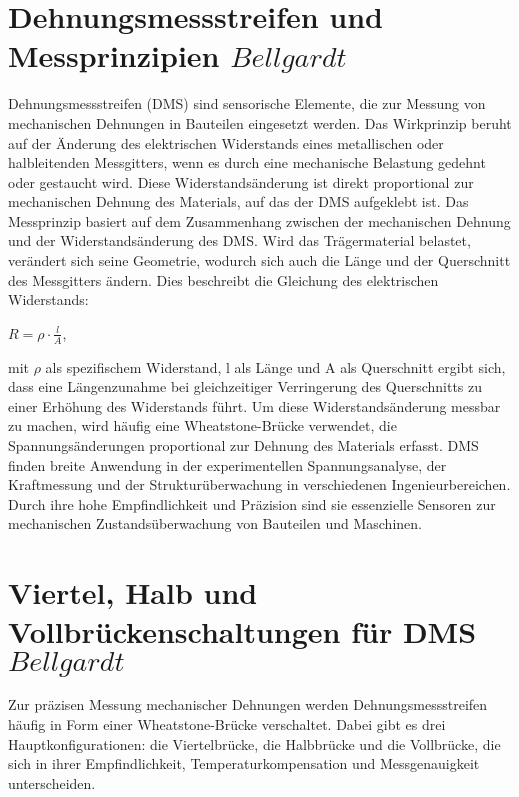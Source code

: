 \section{Dehnungsmessstreifen und Messprinzipien \(Bellgardt\)}
Dehnungsmessstreifen (DMS) sind sensorische Elemente, die zur Messung von mechanischen Dehnungen in Bauteilen eingesetzt werden. Das Wirkprinzip beruht auf der Änderung des elektrischen Widerstands eines metallischen oder halbleitenden Messgitters, wenn es durch eine mechanische Belastung gedehnt oder gestaucht wird. Diese Widerstandsänderung ist direkt proportional zur mechanischen Dehnung des Materials, auf das der DMS aufgeklebt ist. 
Das Messprinzip basiert auf dem Zusammenhang zwischen der mechanischen Dehnung und der Widerstandsänderung des DMS. Wird das Trägermaterial belastet, verändert sich seine Geometrie, wodurch sich auch die Länge und der Querschnitt des Messgitters ändern. Dies beschreibt die Gleichung des elektrischen Widerstands:

$R = \rho \cdot \frac{l}{A}$,

mit $\rho$ als spezifischem Widerstand, l als Länge und A als Querschnitt ergibt sich, dass eine Längenzunahme bei gleichzeitiger Verringerung des Querschnitts zu einer Erhöhung des Widerstands führt. Um diese Widerstandsänderung messbar zu machen, wird häufig eine Wheatstone-Brücke verwendet, die Spannungsänderungen proportional zur Dehnung des Materials erfasst.
DMS finden breite Anwendung in der experimentellen Spannungsanalyse, der Kraftmessung und der Strukturüberwachung in verschiedenen Ingenieurbereichen. Durch ihre hohe Empfindlichkeit und Präzision sind sie essenzielle Sensoren zur mechanischen Zustandsüberwachung von Bauteilen und Maschinen.










\newpage{}
\section{Viertel\-, Halb\- und Vollbr\"uckenschaltungen für DMS \(Bellgardt\)}
Zur präzisen Messung mechanischer Dehnungen werden Dehnungsmessstreifen häufig in Form einer Wheatstone-Brücke verschaltet. Dabei gibt es drei Hauptkonfigurationen: die Viertelbrücke, die Halbbrücke und die Vollbrücke, die sich in ihrer Empfindlichkeit, Temperaturkompensation und Messgenauigkeit unterscheiden.
